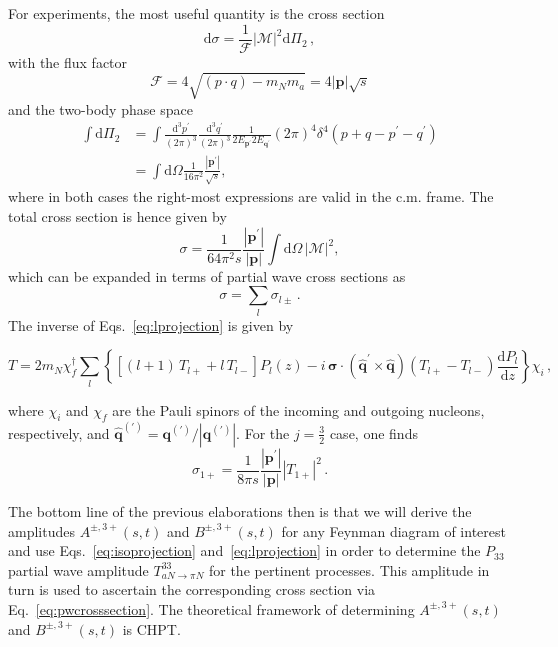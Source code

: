 \documentclass[reprint,amssymb,amsmath,floatfix,aps,prd,groupedaddress,nofootinbib]{revtex4-2}
\newcommand{\sdot}[2]{\left( #1\cdot #2 \right)}
\begin{document}
For experiments, the most useful quantity is the cross section
\begin{equation}
\mathrm{d}\sigma = \frac{1}{\mathcal{F}}|\mathcal{M}|^2 \mathrm{d}\Pi_2\,,
\end{equation}
with the flux factor
\begin{equation}
\mathcal{F} = 4 \sqrt{\sdot{p}{q}-m_N m_a} = 4 |\mathbf{p}| \sqrt{s}
\end{equation}
and the two-body phase space
\begin{align}
\int \mathrm{d}\Pi_2 &= \int \frac{\mathrm{d}^3p^\prime}{(2\pi)^3} \frac{\mathrm{d}^3q^\prime}{(2\pi)^3}
\frac{1}{2E_\mathbf{p^\prime}2E_\mathbf{q^\prime}} (2\pi)^4 \delta^4(p+q-p^\prime-q^\prime) \nonumber\\
&=
\int \mathrm{d}\Omega \frac{1}{16\pi^2} \frac{|\mathbf{p}^\prime|}{\sqrt{s}} ,
\end{align}
where in both cases the right-most expressions are valid in the c.m. frame. The total cross section
is hence given by
\begin{equation}
\sigma = \frac{1}{64\pi^2s}\frac{|\mathbf{p^\prime}|}{|\mathbf{p}|}\int\mathrm{d}\Omega\,|\mathcal{M}|^2 ,
\end{equation}
which can be expanded in terms of partial wave cross sections as
\begin{equation}
\sigma = \sum_{l} \sigma_{l\pm}\,.
\end{equation}
The inverse of Eqs.~\eqref{eq:lprojection} is given by
\begin{widetext}\begin{equation}
T = 2m_N \chi_f^\dagger  \sum_l \left\{ \left[(l+1)\, T_{l+} +l\,T_{l-} \right] P_l (z) -
i\,\bm{\sigma}\cdot (\mathbf{\hat{q}^{\prime}}\times\mathbf{\hat{q}}) (T_{l+} - T_{l-})
\frac{\mathrm{d}P_l}{\mathrm{d}z} \right\}\chi_i\,,
\end{equation}
\end{widetext}
where $\chi_i$ and $\chi_f$ are the Pauli spinors of the incoming and outgoing nucleons, respectively,
and $\mathbf{\hat{q}^{(\prime)}} = \mathbf{q^{(\prime)}}/|\mathbf{q^{(\prime)}}|$. For the $j=\tfrac{3}{2}$ case, one finds
\begin{equation}\label{eq:pwcrosssection}
\sigma_{1+} = \frac{1}{8\pi s} \frac{|\mathbf{p^\prime}|}{|\mathbf{p}|} |T_{1+}|^2\,.
\end{equation}

The bottom line of the previous elaborations then is that we will derive the amplitudes $A^{\pm,3+}(s,t)$
and $B^{\pm,3+}(s,t)$ for any Feynman diagram of interest and use Eqs.~\eqref{eq:isoprojection}
and~\eqref{eq:lprojection} in order to determine the $P_{33}$ partial wave amplitude $T^{33}_{aN\to\pi N}$
for the pertinent processes. This amplitude in turn is used to ascertain the corresponding cross section
via Eq.~\eqref{eq:pwcrosssection}. The theoretical framework of determining $A^{\pm,3+}(s,t)$ and $B^{\pm,3+}(s,t)$
is CHPT.
\end{document}
